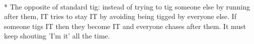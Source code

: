 \begin{minipage}{\textwidth}
\equip{}
\\*
The opposite of standard tig: instead of trying to tig someone else by running
after them, IT tries to stay IT by avoiding being tigged by everyone else. If someone tigs IT then they become IT and everyone chases after them.  It must keep shouting 'I'm it' all the time.
\end{minipage}    \vfill
